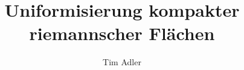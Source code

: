 

\title{Uniformisierung kompakter riemannscher Flächen}
\author{Tim Adler}




%

% 

% 

% 

% 

% 





